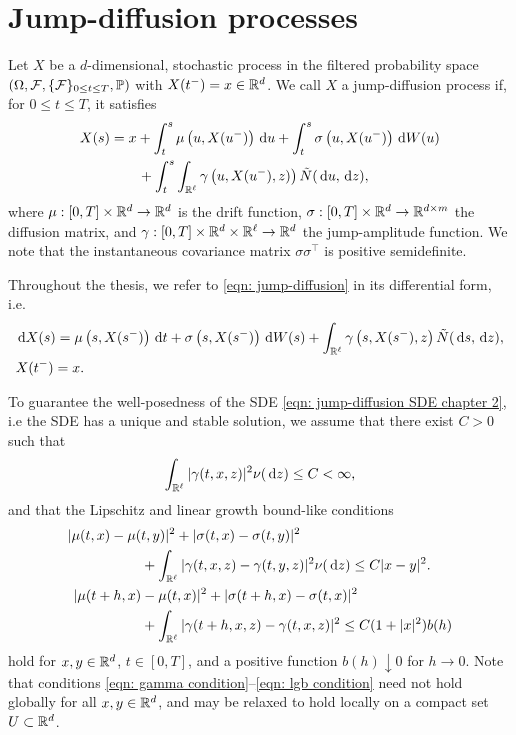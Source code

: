 \section{Jump-diffusion processes}
\label{section: Jump-diffusion processes}
Let $X$ be a $d$-dimensional, stochastic process in the filtered probability space \newline $(\Omega, \mathcal{F}, \{\mathcal{F}\}_{0 \leq t \leq T}, \mathbb{P})$ with $X(t^-)=x \in \mathbb{R}^d$. We call $X$ a jump-diffusion process if, for $0 \leq t \leq T$, it satisfies
\begin{align}
    X(s) &= x + \int_t^s \mu\left(u,X(u^-)\right) \,\mathrm{d} u + \int_t^s \sigma\left(u,X(u^-)\right) \,\mathrm{d} W(u) \nonumber \\
    & \qquad + \int_t^s \int_{\mathbb{R}^\ell} \gamma\left(u,X(u^-),z)\right) \tilde N(\,\mathrm{d} u, \,\mathrm{d} z),
    \label{eqn: jump-diffusion}
\end{align}
where $\mu: [0,T]\times \mathbb{R}^d \rightarrow \mathbb{R}^d$ is the drift function, $\sigma: [0,T] \times \mathbb{R}^d \rightarrow \mathbb{R}^{d\times m}$ the diffusion matrix, and $\gamma: [0,T]\times \mathbb{R}^d \times \mathbb{R}^\ell \rightarrow \mathbb{R}^d$ the jump-amplitude function. We note that the instantaneous covariance matrix $\sigma\sigma^\top$ is positive semidefinite. 

Throughout the thesis, we refer to \eqref{eqn: jump-diffusion} in its differential form, i.e.
\begin{align}
    &\,\mathrm{d} X(s) = \mu\left(s, X(s^-)\right) \,\mathrm{d} t + \sigma\left(s,X(s^-) \right) \,\mathrm{d} W(s) + \int_{\mathbb{R}^\ell} \gamma \left(s,X(s^-),z \right) \tilde N (\,\mathrm{d} s, \,\mathrm{d} z),\nonumber\\
    &X(t^-)=x.
    \label{eqn: jump-diffusion SDE chapter 2}
\end{align}

To guarantee the well-posedness of the SDE \eqref{eqn: jump-diffusion SDE chapter 2}, i.e the SDE has a unique and stable solution, we assume that there exist $C>0$ such that
\begin{equation}
    \int_{\mathbb{R}^\ell}|\gamma(t,x,z)|^2 \nu(\,\mathrm{d} z) \leq C < \infty,
    \label{eqn: gamma condition}
\end{equation}
and that the Lipschitz and linear growth bound-like conditions 
\begin{align}
    |\mu(t,x) - \mu(&t,y)|^2 + |\sigma(t,x) - \sigma(t,y)|^2 \nonumber\\
    & + \int_{\mathbb{R}^\ell} |\gamma(t,x,z) - \gamma(t,y,z)|^2 \nu(\,\mathrm{d} z) \leq C |x-y|^2.
    \label{eqn: Lipschitz condition} \\
    |\mu(t+h,x) &- \mu(t,x)|^2 + |\sigma(t+h,x) - \sigma(t,x)|^2 \nonumber\\
    &+ \int_{\mathbb{R}^\ell}|\gamma(t+h,x,z) - \gamma(t,x,z)|^2 \leq C (1+|x|^2) b(h)
    \label{eqn: lgb condition}
\end{align}
hold for $x,y \in \mathbb{R}^d$, $t \in [0,T]$, and a positive function $b(h) \downarrow 0$ for $h \rightarrow 0$. Note that conditions \eqref{eqn: gamma condition}--\eqref{eqn: lgb condition} need not hold globally for all $x,y \in \mathbb{R}^d$, and may be relaxed to hold locally on a compact set $U \subset \mathbb{R}^d$.

